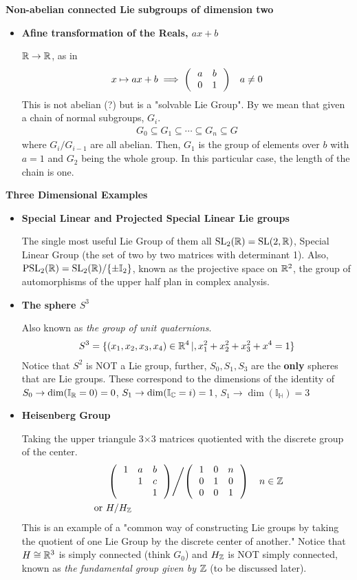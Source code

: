 \documentclass[12pt,a4paper]{report}
\newcommand{\SL}{\operatorname{SL}}
\newcommand{\PSL}{\operatorname{PSL}}
\begin{document}
\begin{description}
 	\textbf{Non-abelian connected Lie subgroups of dimension two}
 	\begin{itemize}
 		\item \textbf{Afine transformation of the Reals, $ax+b$}
 		
 		$\mathbb{R} \to \mathbb{R}$, as in 
 		\begin{align*}
 			x &\mapsto ax+b \implies \left (\,  \begin{array}{c c} a&b \\ 0 & 1 \end{array}  \,\right ) & a \ne 0
 		\end{align*}This is not abelian (?) but is a "solvable Lie Group".  By  we mean that given a chain of normal subgroups, $G_i$.
 		\begin{align*}
 			G_0\subseteq G_1 \subseteq \cdots \subseteq G_n \subseteq G
 		\end{align*}where $G_{i}/G_{i-1}$ are all abelian.  Then, $G_1$ is the group of elements over $b$ with $a=1$ and $G_2$ being the whole group.  In this particular case, the length of the chain is one.
 	\end{itemize}
 		
 	\item \textbf{Three Dimensional Examples}
 	
 	\begin{itemize}

 	\item \textbf{Special Linear and Projected Special Linear Lie groups}
 	
 	The single most useful Lie Group of them all $\SL_2(\R)=\SL(2,\R)$, Special Linear Group (the set of two by two matrices with determinant 1).  Also, $\PSL_2(\R) = \SL_2(\R)/\{\pm \mathbb{I}_2\}$, known as the projective space on $\mathbb{R}^2$, the group of automorphisms of the upper half plan in complex analysis.
 	
 	\item \textbf{The sphere $S^3$}
 	
 	Also known as \textit{the group of unit quaternions}.
 	\begin{align*}
 		S^3 = \{(x_1,x_2,x_3,x_4)\in \mathbb{R}^4\,|,x_1^2+x_2^2+x_3^2+x^4=1 \}
 	\end{align*}Notice that $S^2$ is NOT a Lie group, further, $S_0, S_1, S_3$ are the \textbf{only} spheres that are Lie groups. These correspond to the dimensions of the identity of $S_0\to \dim(\mathbb{I}_{\mathbb{R}} = 0)=0$, $S_1 \to \dim(\mathbb{I}_{\mathbb{C}} = i)=1$, $S_1 \to \dim(\mathbb{I}_\mathbb{H})=3$
 	
 	\item \textbf{Heisenberg Group}
 	
 	Taking the upper triangule 3$\times$3 matrices quotiented with the discrete group of the center.
 	\begin{align*}
 		&\left. \left (\,  \begin{array}{c c c} 1&a&b \\  & 1 & c \\  &  & 1 \end{array}  \,\right )  \middle/ \left (\,  \begin{array}{c c c} 1&0&n \\ 0 & 1 & 0 \\ 0 & 0 & 1 \end{array}  \,\right ) \right. & n \in \mathbb{Z} \\
 		\text{ or } &H/H_{\mathbb{Z}}
 	\end{align*}This is an example of a "common way of constructing Lie groups by taking the quotient of one Lie Group by the discrete center of another."  Notice that $H \cong \mathbb{R}^3$ is simply connected (think $G_0$) and $H_{\mathbb{Z}}$ is NOT simply connected, known as \textit{the fundamental group given by $\mathbb{Z}$} (to be discussed later).
 	

\end{itemize}
\end{description}
\end{document}
